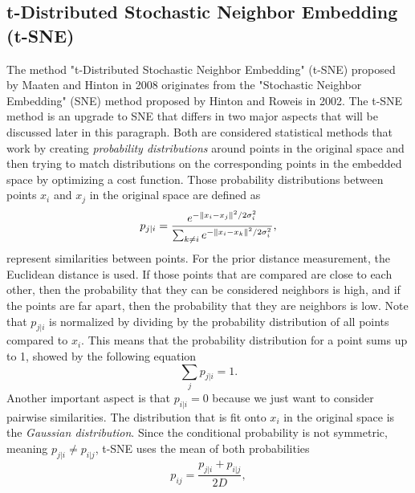 \subsection{t-Distributed Stochastic Neighbor Embedding (t-SNE)}

The method "t-Distributed Stochastic Neighbor Embedding" (t-SNE) proposed by Maaten and Hinton in 2008 \cite{t-SNE08} originates from the "Stochastic Neighbor Embedding" (SNE) method proposed by Hinton and Roweis in 2002. \cite{SNE02} The t-SNE method is an upgrade to SNE that differs in two major aspects that will be discussed later in this paragraph. Both are considered statistical methods that work by creating \textit{probability distributions} around points in the original space and then trying to match distributions on the corresponding points in the embedded space by optimizing a cost function. Those probability distributions between points $x_i$ and $x_j$ in the original space are defined as
\begin{equation}
    p_{j|i}=\frac{e^{{-\norm{x_i-x_j}^2 / 2\sigma_i^2}}}{\sum_{k\neq i}e^{-\norm{x_i-x_k}^2 / 2\sigma_i^2}},
\end{equation}
represent similarities between points. For the prior distance measurement, the Euclidean distance is used. If those points that are compared are close to each other, then the probability that they can be considered neighbors is high, and if the points are far apart, then the probability that they are neighbors is low. Note that $p_{j|i}$ is normalized by dividing by the probability distribution of all points compared to $x_i$. This means that the probability distribution for a point sums up to 1, showed by the following equation
\begin{equation}
    \sum_j p_{j|i}=1.
\end{equation}
Another important aspect is that $p_{i|i}=0$ because we just want to consider pairwise similarities. The distribution that is fit onto $x_i$ in the original space is the \textit{Gaussian distribution}. Since the conditional probability is not symmetric, meaning $p_{j|i} \neq p_{i|j}$, t-SNE uses the mean of both probabilities
\begin{equation}
    p_{ij}=\frac{p_{j|i}+p_{i|j}}{2D},
\end{equation}
